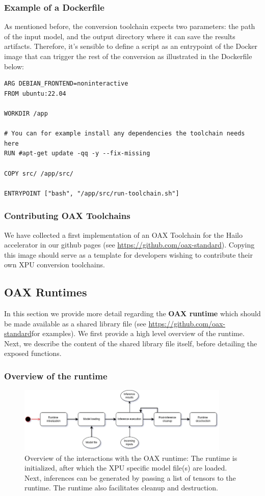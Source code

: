\documentclass{article}
\newcommand{\oaxgit}{\href{https://github.com/oax-standard}{https://github.com/oax-standard}}
\begin{document}
\subsubsection{Example of a Dockerfile}
As mentioned before, the conversion toolchain expects two parameters: the path of the input model, and the output directory where it can save the results artifacts. Therefore, it's sensible to define a script as an entrypoint of the Docker image that can trigger the rest of the conversion as illustrated in the Dockerfile below:
\begin{lstlisting}
ARG DEBIAN_FRONTEND=noninteractive
FROM ubuntu:22.04

WORKDIR /app

# You can for example install any dependencies the toolchain needs here
RUN #apt-get update -qq -y --fix-missing

COPY src/ /app/src/

ENTRYPOINT ["bash", "/app/src/run-toolchain.sh"]
\end{lstlisting}

\subsubsection{Contributing OAX Toolchains}

We have collected a first implementation of an OAX Toolchain for the Hailo accelerator in our github pages (see \oaxgit). Copying this image should serve as a template for developers wishing to contribute their own XPU conversion toolchains.

\subsection{OAX Runtimes}

In this section we provide more detail regarding the \textbf{OAX runtime} which should be made available as a shared library file (see \oaxgit for examples). We first provide a high level overview of the runtime. Next, we describe the content of the shared library file itself, before detailing the exposed functions.

\subsubsection{Overview of the runtime}

\begin{figure} [!htbp]
\centering
\includegraphics[width=0.9\textwidth]{img/runtime}
\caption{Overview of the interactions with the OAX runtime: The runtime is initialized, after which the XPU specific model file(s) are loaded. Next, inferences can be generated by passing a list of tensors to the runtime. The runtime also facilitates cleanup and destruction.}
\label{fig-pipeline}
\end{figure}
\end{document}
